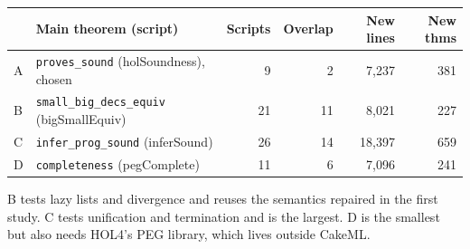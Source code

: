 \documentclass[11pt,a4paper]{article}
\newcommand{\code}[1]{\texttt{#1}}
\begin{document}
\begin{table}[h]\small
\begin{tabularx}{\textwidth}{@{}lXrrrr@{}}
\toprule
& Main theorem (script) & Scripts & Overlap & New lines & New thms\\
\midrule
A & \code{proves\_sound} (holSoundness), chosen & 9 & 2 & 7{,}237 & 381\\
B & \code{small\_big\_decs\_equiv} (bigSmallEquiv) & 21 & 11 & 8{,}021 & 227\\
C & \code{infer\_prog\_sound} (inferSound) & 26 & 14 & 18{,}397 & 659\\
D & \code{completeness} (pegComplete) & 11 & 6 & 7{,}096 & 241\\
\bottomrule
\end{tabularx}
\end{table}
B tests lazy lists and divergence and reuses the semantics repaired in the first study. C tests unification and termination and is the largest. D is the smallest but also needs HOL4's PEG library, which lives outside CakeML.
\end{document}
